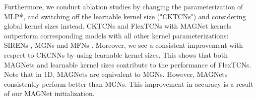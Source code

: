 \documentclass{article} \usepackage{iclr2022_conference,times}
\def\bpsi{{\boldsymbol{\psi}}}
\newcommand{\mlp}{{\btt MLP}}
\newcommand{\mlppsi}{\mlp$^{\bpsi}$}
\begin{document}
\begin{table}
\begin{minipage}{0.50 \textwidth}
\begin{small}
\end{small}
\end{minipage}
\vspace{-8mm}
\end{table}

Furthermore, we conduct ablation studies by changing the parameterization of \mlppsi, and switching off the learnable kernel size ("CKTCNs") and considering global kernel sizes instead. CKTCNs and FlexTCNs with MAGNet kernels outperform corresponding models with all other kernel parameterizations: SIRENs \citep{sitzmann2020implicit}, MGNs and MFNs \citep{fathony2021multiplicative}. Moreover, we see a consistent improvement with respect to CKCNNs \citep{romero2021ckconv} by using learnable kernel sizes. This shows that both MAGNets and learnable kernel sizes contribute to the performance of FlexTCNs.
Note that in 1D, MAGNets are equivalent to MGNs. However, MAGNets consistently perform better than MGNs. This improvement in accuracy is a result of our MAGNet initialization.
\end{document}
